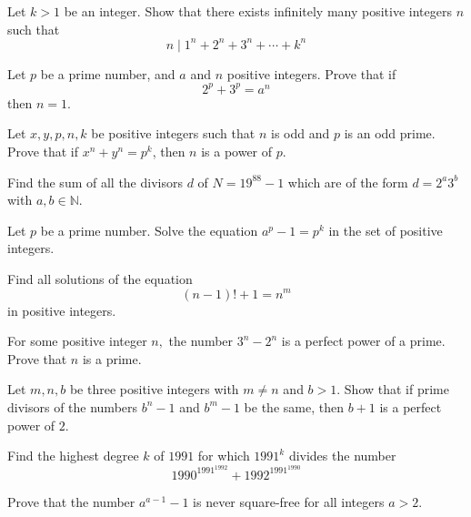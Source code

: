 \documentclass{subfile}
\begin{document}
	\begin{problem}
		Let $k>1$ be an integer. Show that there exists infinitely many positive integers $n$ such that
		\[n \mid 1^n + 2^n +3^n +\cdots+k^n\]
	\end{problem}


	\begin{problem}[Ireland 1996]
		Let $p$ be a prime number, and $a$ and $n$ positive integers. Prove that if
		\[2^p+3^p=a^n\]
		then $n=1.$
	\end{problem}



	\begin{problem}[Russia 1996]
		Let $x, y, p, n, k$ be positive integers such that $n$ is odd and $p$ is an odd prime. Prove that if $x^n + y^n = p^k$, then $n$ is a power of $p$.
	\end{problem}

	\begin{problem}
		Find the sum of all the divisors $d$ of $N=19^{88}-1$ which are of the form $d=2^{a}3^{b}$ with  $a,b \in \mathbb N$.
	\end{problem}

	\begin{problem}
		Let $p$ be a prime number. Solve the equation $a^p-1 = p^k$ in the set of positive integers.
	\end{problem}

	\begin{problem}
		Find all solutions of the equation
		\[(n-1)! + 1 = n^m\]
		in positive integers.
	\end{problem}

	\begin{problem}[Bulgaria 1997]
		For some positive integer $n,$ the number $3^n-2^n$ is a perfect power of a prime. Prove that $n$ is a prime.
	\end{problem}

	\begin{problem}
		Let $m,n,b$ be three positive integers with $m \neq n$ and $b>1.$ Show that if prime divisors of the numbers $b^n-1$ and $b^m-1$ be the same, then $b+1$ is a perfect power of $2.$
	\end{problem}

	\begin{problem}
		Find the highest degree $ k$ of $ 1991$ for which $ 1991^k$ divides the number \[ 1990^{1991^{1992}} + 1992^{1991^{1990}}\]
	\end{problem}

	\begin{problem}
		Prove that the number $a^{a-1}-1$ is never square-free for all integers $a>2$.
	\end{problem}
\end{document}
